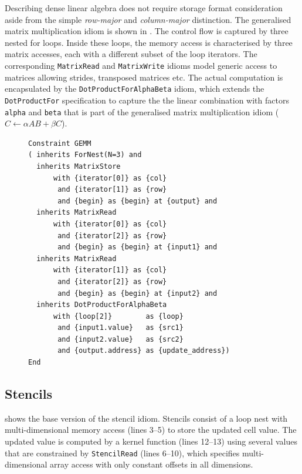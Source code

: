     Describing dense linear algebra does not require storage format
    consideration aside from the simple {\it row-major} and {\it column-major}
    distinction.
    The generalised matrix multiplication idiom is shown in .
    The control flow is captured by three nested for loops.
    Inside these loops, the memory access is characterised by three matrix
    accesses, each with a different subset of the loop iterators.
    The corresponding \texttt{MatrixRead} and \texttt{MatrixWrite} idioms model
    generic access to matrices allowing strides, transposed matrices etc.
    The actual computation is encapsulated by the
    \texttt{DotProductForAlphaBeta} idiom, which extends the
    \texttt{DotProductFor} specification to capture the the linear combination
    with factors \texttt{alpha} and \texttt{beta} that is part of the
    generalised matrix multiplication idiom ($C\gets\alpha AB+\beta C$).

\begin{figure}[H]
\begin{lstlisting}[language=IDL, label={fig:gemm}, caption=
   {IDL specification of the generalised dense matrix-vector multiplication
    (GEMM)\leftskip=0pt\rightskip=0pt}]
Constraint GEMM
( inherits ForNest(N=3) and
  inherits MatrixStore
      with {iterator[0]} as {col}
       and {iterator[1]} as {row}
       and {begin} as {begin} at {output} and
  inherits MatrixRead
      with {iterator[0]} as {col}
       and {iterator[2]} as {row}
       and {begin} as {begin} at {input1} and
  inherits MatrixRead
      with {iterator[1]} as {col}
       and {iterator[2]} as {row}
       and {begin} as {begin} at {input2} and
  inherits DotProductForAlphaBeta
      with {loop[2]}        as {loop}
       and {input1.value}   as {src1}
       and {input2.value}   as {src2}
       and {output.address} as {update_address})
End
\end{lstlisting}
\end{figure}

\subsection{Stencils}

     shows the base version of the stencil idiom.
    Stencils consist of a loop nest with multi-dimensional memory access
    (lines 3--5) to store the updated cell value.
    The updated value is computed by a kernel function (lines 12--13) using
    several values that are constrained by \texttt{StencilRead} (lines 6--10),
    which specifies multi-dimensional array access with only constant offsets in
    all dimensions.

